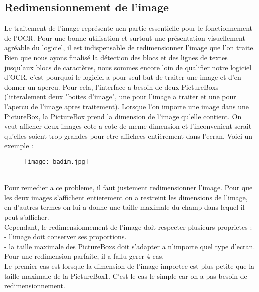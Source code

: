 \documentclass{article}
\begin{document}
              \subsection{Redimensionnement de l'image}
Le traitement de l’image représente uen partie essentielle pour le fonctionnement de l’OCR. Pour une bonne utilisation et surtout une présentation visuellement agréable du logiciel, il est indispensable de redimensionner l’image que l’on traite.
Bien que nous ayons finalisé la détection des blocs et des lignes de textes jusqu’aux blocs de caractères, nous sommes encore loin de qualifier notre logiciel d’OCR, c’est pourquoi le logiciel a pour seul but de traiter une image et d’en donner un apercu. Pour cela, l’interface a besoin de deux PictureBoxs (litteralement deux "boites d’image", une pour l’image a traiter et une pour l’apercu de l’image apres traitement). 
Lorsque l’on importe une image dans une PictureBox, la PictureBox prend la dimension de l’image qu’elle contient. On veut afficher deux images cote a cote de meme dimension et l’inconvenient serait qu’elles soient trop grandes pour etre affichees entièrement dans l’ecran. Voici un exemple :\\
\begin{figure}[hp]
	\centering
    \texttt{[image: badim.jpg]}
	 \label{Mauvaise redimension}
\end{figure}
\\
Pour remedier a ce probleme, il faut justement redimensionner l'image. Pour que
les deux images s'affichent entierement on a restreint les dimensions de l'image, en
d'autres termes on lui a donne une taille maximale du champ dans lequel il peut s'afficher.\\

Cependant, le redimensionnement de l'image doit respecter plusieurs proprietes :
- l'image doit conserver ses proportions.\\
- la taille maximale des PictureBoxs doit s'adapter a n'importe quel type d'ecran.
Pour une redimension parfaite, il a fallu gerer 4 cas.\\
Le premier cas est lorsque la dimension de l'image importee est plus petite que la taille
maximale de la PictureBox1. C'est le cas le simple car on a pas besoin de redimensionnement.\\
\end{document}

